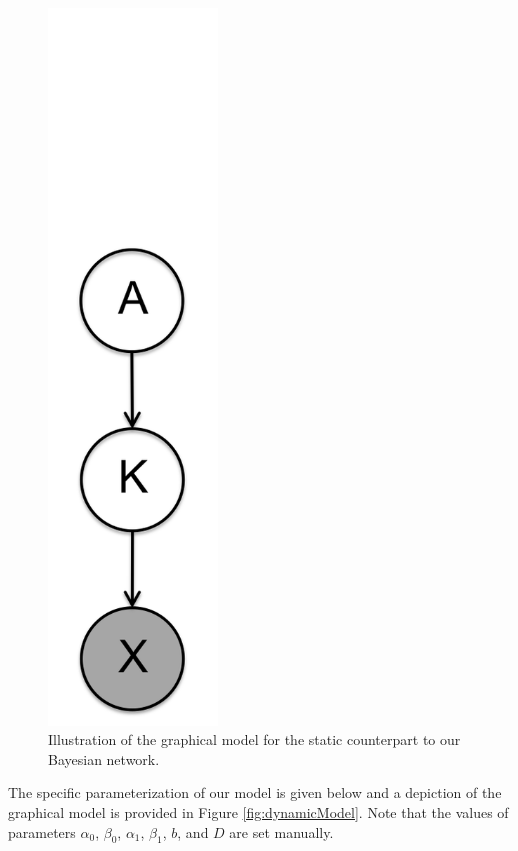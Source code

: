 \documentclass{article}
\begin{document}
\begin{figure}[tbp]
\begin{minipage}[c]{0.24\linewidth}
      \includegraphics[width=0.4\textwidth]{fig/static_ggm_model.png}
      \caption{Illustration of the graphical model for the static counterpart to our Bayesian network.}
      \label{fig:staticModel}
  \end{minipage}
\end{figure}

The specific parameterization of our model is given below and a depiction of the graphical model is provided in Figure \ref{fig:dynamicModel}. Note that the values of parameters $\alpha_0$, $\beta_0$, $\alpha_1$, $\beta_1$, $b$, and $D$ are set manually.
\end{document}
